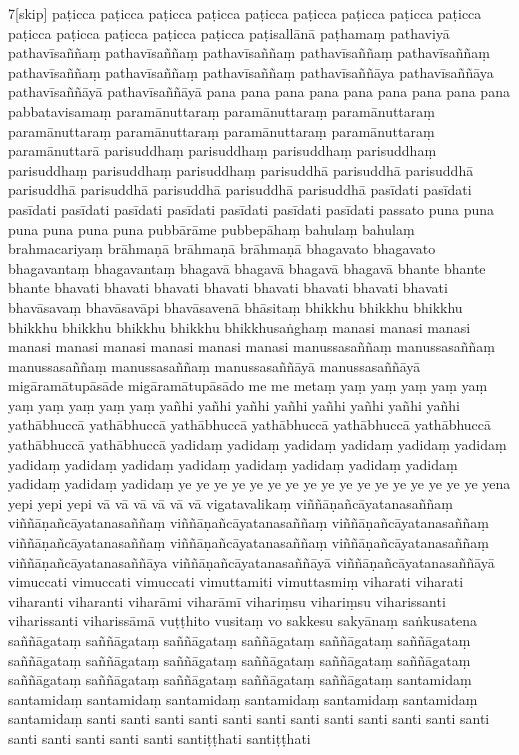 \documentclass[12pt]{article}
\begin{document}
\begin{multicols}{7}[skip]
paṭicca
paṭicca
paṭicca
paṭicca
paṭicca
paṭicca
paṭicca
paṭicca
paṭicca
paṭicca
paṭicca
paṭicca
paṭicca
paṭicca
paṭisallānā
paṭhamaṃ
pathaviyā
pathavīsaññaṃ
pathavīsaññaṃ
pathavīsaññaṃ
pathavīsaññaṃ
pathavīsaññaṃ
pathavīsaññaṃ
pathavīsaññaṃ
pathavīsaññaṃ
pathavīsaññāya
pathavīsaññāya
pathavīsaññāyā
pathavīsaññāyā
pana
pana
pana
pana
pana
pana
pana
pana
pana
pabbatavisamaṃ
paramānuttaraṃ
paramānuttaraṃ
paramānuttaraṃ
paramānuttaraṃ
paramānuttaraṃ
paramānuttaraṃ
paramānuttaraṃ
paramānuttarā
parisuddhaṃ
parisuddhaṃ
parisuddhaṃ
parisuddhaṃ
parisuddhaṃ
parisuddhaṃ
parisuddhaṃ
parisuddhā
parisuddhā
parisuddhā
parisuddhā
parisuddhā
parisuddhā
parisuddhā
parisuddhā
pasīdati
pasīdati
pasīdati
pasīdati
pasīdati
pasīdati
pasīdati
pasīdati
pasīdati
passato
puna
puna
puna
puna
puna
puna
pubbārāme
pubbepāhaṃ
bahulaṃ
bahulaṃ
brahmacariyaṃ
brāhmaṇā
brāhmaṇā
brāhmaṇā
bhagavato
bhagavato
bhagavantaṃ
bhagavantaṃ
bhagavā
bhagavā
bhagavā
bhagavā
bhante
bhante
bhante
bhavati
bhavati
bhavati
bhavati
bhavati
bhavati
bhavati
bhavati
bhavāsavaṃ
bhavāsavāpi
bhavāsavenā
bhāsitaṃ
bhikkhu
bhikkhu
bhikkhu
bhikkhu
bhikkhu
bhikkhu
bhikkhu
bhikkhusaṅghaṃ
manasi
manasi
manasi
manasi
manasi
manasi
manasi
manasi
manasi
manussasaññaṃ
manussasaññaṃ
manussasaññaṃ
manussasaññaṃ
manussasaññāyā
manussasaññāyā
migāramātupāsāde
migāramātupāsādo
me
me
metaṃ
yaṃ
yaṃ
yaṃ
yaṃ
yaṃ
yaṃ
yaṃ
yaṃ
yaṃ
yaṃ
yañhi
yañhi
yañhi
yañhi
yañhi
yañhi
yañhi
yañhi
yathābhuccā
yathābhuccā
yathābhuccā
yathābhuccā
yathābhuccā
yathābhuccā
yathābhuccā
yathābhuccā
yadidaṃ
yadidaṃ
yadidaṃ
yadidaṃ
yadidaṃ
yadidaṃ
yadidaṃ
yadidaṃ
yadidaṃ
yadidaṃ
yadidaṃ
yadidaṃ
yadidaṃ
yadidaṃ
yadidaṃ
yadidaṃ
yadidaṃ
ye
ye
ye
ye
ye
ye
ye
ye
ye
ye
ye
ye
ye
ye
ye
ye
ye
yena
yepi
yepi
yepi
vā
vā
vā
vā
vā
vā
vigatavalikaṃ
viññāṇañcāyatanasaññaṃ
viññāṇañcāyatanasaññaṃ
viññāṇañcāyatanasaññaṃ
viññāṇañcāyatanasaññaṃ
viññāṇañcāyatanasaññaṃ
viññāṇañcāyatanasaññaṃ
viññāṇañcāyatanasaññaṃ
viññāṇañcāyatanasaññāya
viññāṇañcāyatanasaññāyā
viññāṇañcāyatanasaññāyā
vimuccati
vimuccati
vimuccati
vimuttamiti
vimuttasmiṃ
viharati
viharati
viharanti
viharanti
viharāmi
viharāmī
vihariṃsu
vihariṃsu
viharissanti
viharissanti
viharissāmā
vuṭṭhito
vusitaṃ
vo
sakkesu
sakyānaṃ
saṅkusatena
saññāgataṃ
saññāgataṃ
saññāgataṃ
saññāgataṃ
saññāgataṃ
saññāgataṃ
saññāgataṃ
saññāgataṃ
saññāgataṃ
saññāgataṃ
saññāgataṃ
saññāgataṃ
saññāgataṃ
saññāgataṃ
saññāgataṃ
saññāgataṃ
saññāgataṃ
santamidaṃ
santamidaṃ
santamidaṃ
santamidaṃ
santamidaṃ
santamidaṃ
santamidaṃ
santamidaṃ
santi
santi
santi
santi
santi
santi
santi
santi
santi
santi
santi
santi
santi
santi
santi
santi
santi
santiṭṭhati
santiṭṭhati

\end{multicols}
\end{document}
